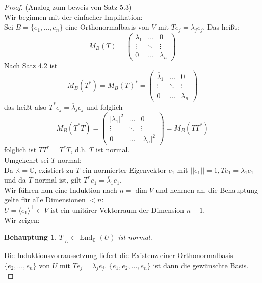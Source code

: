 \documentclass[12pt,a4paper]{article}
\newtheorem*{claim*}{Behauptung}
\theoremstyle{definition}
\theoremstyle{remark}
\renewcommand{\bar}[1]{\overline{#1}}
\DeclareMathOperator{\End}{End}
\begin{document}
	\begin{proof}
		(Analog zum beweis von Satz 5.3) \\
		Wir beginnen mit der einfacher Implikation: \\
		Sei $B = \{ e_1,...,e_n \}$ eine Orthonormalbasis von $V$ mit $Te_j = \lambda_j e_j$. Das heißt: \\
		\begin{equation}
			M_B(T) = 
			\begin{pmatrix}
				\lambda_1 & \dots & 0 \\
				\vdots & \ddots & \vdots \\
				0 & \dots & \lambda_n
			\end{pmatrix}
		\end{equation}
		Nach Satz 4.2 ist 
		\begin{equation}
			M_B(T^*) = M_B(T)^* = 
			\begin{pmatrix}
				\bar{\lambda}_1 & \dots & 0 \\
				\vdots & \ddots & \vdots \\
				0 & \dots & \bar{\lambda}_n
			\end{pmatrix}
		\end{equation}
		das heißt also $T^*e_j = \bar{\lambda}_j e_j$ und folglich
		\begin{equation}
			M_B(T^*T) = 
			\begin{pmatrix}
				|\lambda_1|^2 & \dots & 0 \\
				\vdots & \ddots & \vdots \\
				0 & \dots & |\lambda_n|^2
			\end{pmatrix}
			= M_B(TT^*)
		\end{equation}
		folglich ist $TT^* = T^* T$, d.h. $T$ ist normal. \\
		Umgekehrt sei $T$ normal: \\
		 Da $\mathbb{K} = \mathbb{C}$, existiert zu $T$ ein normierter Eigenvektor $e_1$ mit $||e_1 ||=1, Te_1 = \lambda_1 e_1$ und da $T$ normal ist, gilt $T^* e_1 = \bar{\lambda}_1 e_1 $. \\
		 Wir führen nun eine Induktion nach $n = \dim V$ und nehmen an, die Behauptung gelte für alle Dimensionen $<n$: \\
		 $U = \langle e_1 \rangle^{\perp} \subset V$ ist ein unitärer Vektorraum der Dimension $n-1$. \\
		 Wir zeigen:
		 \begin{claim*}
		 	$T|_U \in \End_{\mathbb{C}}(U)$ ist normal.
		 \end{claim*}
		 Die Induktionsvorraussetzung liefert die Existenz einer Orthonormalbasis $\{ e_2,...,e_n \}$ von $U$ mit $Te_j = \lambda_j e_j$. $\{ e_1,e_2,...,e_n \}$ ist dann die gewünschte Basis. \\

\end{proof}
\end{document}
